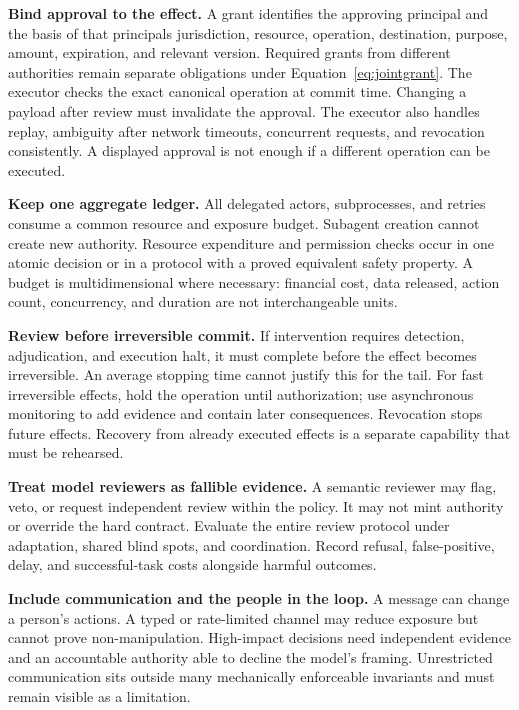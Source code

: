 \documentclass[10pt,twocolumn,letterpaper]{article}
\newcommand{\para}[1]{\smallskip\noindent\textbf{#1}\enspace}
\begin{document}
\para{Bind approval to the effect.} A grant identifies the approving principal and the basis of that principal\textquotesingle s jurisdiction, resource, operation, destination, purpose, amount, expiration, and relevant version. Required grants from different authorities remain separate obligations under Equation~\eqref{eq:jointgrant}. The executor checks the exact canonical operation at commit time. Changing a payload after review must invalidate the approval. The executor also handles replay, ambiguity after network timeouts, concurrent requests, and revocation consistently. A displayed approval is not enough if a different operation can be executed.

\para{Keep one aggregate ledger.} All delegated actors, subprocesses, and retries consume a common resource and exposure budget. Subagent creation cannot create new authority. Resource expenditure and permission checks occur in one atomic decision or in a protocol with a proved equivalent safety property. A budget is multidimensional where necessary: financial cost, data released, action count, concurrency, and duration are not interchangeable units.

\para{Review before irreversible commit.} If intervention requires detection, adjudication, and execution halt, it must complete before the effect becomes irreversible. An average stopping time cannot justify this for the tail. For fast irreversible effects, hold the operation until authorization; use asynchronous monitoring to add evidence and contain later consequences. Revocation stops future effects. Recovery from already executed effects is a separate capability that must be rehearsed.

\para{Treat model reviewers as fallible evidence.} A semantic reviewer may flag, veto, or request independent review within the policy. It may not mint authority or override the hard contract. Evaluate the entire review protocol under adaptation, shared blind spots, and coordination. Record refusal, false-positive, delay, and successful-task costs alongside harmful outcomes.

\para{Include communication and the people in the loop.} A message can change a person's actions. A typed or rate-limited channel may reduce exposure but cannot prove non-manipulation. High-impact decisions need independent evidence and an accountable authority able to decline the model's framing. Unrestricted communication sits outside many mechanically enforceable invariants and must remain visible as a limitation.
\end{document}

